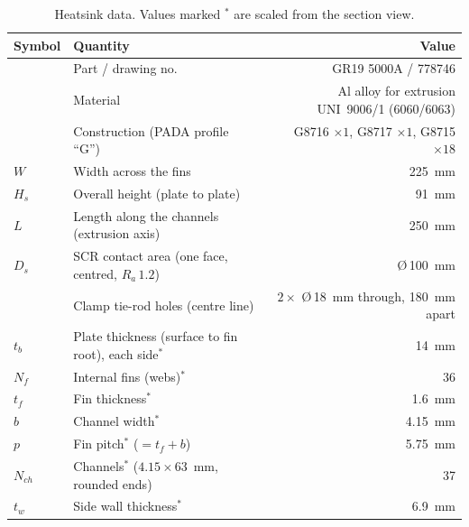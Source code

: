 \documentclass[11pt,a4paper]{article}
\begin{document}
\begin{table}[htbp]
\centering\small
\caption{Heatsink data. Values marked $^{*}$ are scaled from the section view.}
\label{tab:drawing}
\begin{tabular}{llr}
\toprule
Symbol & Quantity & Value \\
\midrule
 & Part / drawing no. & GR19 5000A / 778746 \\
 & Material & Al alloy for extrusion UNI~9006/1 (6060/6063) \\
 & Construction (PADA profile ``G'') & G8716 $\times1$, G8717 $\times1$, G8715 $\times18$ \\
$W$ & Width across the fins & \SI{225}{\milli\metre} \\
$H_s$ & Overall height (plate to plate) & \SI{91}{\milli\metre} \\
$L$ & Length along the channels (extrusion axis) & \SI{250}{\milli\metre} \\
$D_s$ & SCR contact area (one face, centred, $R_a\,1.2$) & \O\,\SI{100}{\milli\metre} \\
 & Clamp tie-rod holes (centre line) & $2\times$ \O\,\SI{18}{\milli\metre} through, \SI{180}{\milli\metre} apart \\
$t_b$ & Plate thickness (surface to fin root), each side$^{*}$ & \SI{14}{\milli\metre} \\
$N_f$ & Internal fins (webs)$^{*}$ & 36 \\
$t_f$ & Fin thickness$^{*}$ & \SI{1.6}{\milli\metre} \\
$b$ & Channel width$^{*}$ & \SI{4.15}{\milli\metre} \\
$p$ & Fin pitch$^{*}$ ($= t_f + b$) & \SI{5.75}{\milli\metre} \\
$N_{ch}$ & Channels$^{*}$ ($4.15\times63$~mm, rounded ends) & 37 \\
$t_w$ & Side wall thickness$^{*}$ & \SI{6.9}{\milli\metre} \\
\bottomrule
\end{tabular}
\end{table}
\end{document}
